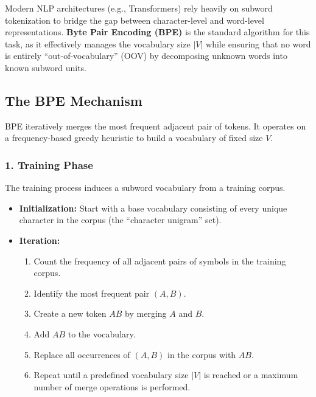 \documentclass[
  italian,
  11pt,
]{article}
\providecommand{\tightlist}{%
  \setlength{\itemsep}{0pt}\setlength{\parskip}{0pt}}
\begin{document}
Modern NLP architectures (e.g., Transformers) rely heavily on subword
tokenization to bridge the gap between character-level and word-level
representations. \textbf{Byte Pair Encoding (BPE)} is the standard
algorithm for this task, as it effectively manages the vocabulary size
\(|V|\) while ensuring that no word is entirely ``out-of-vocabulary''
(OOV) by decomposing unknown words into known subword units.

\subsection{The BPE Mechanism}\label{the-bpe-mechanism}

BPE iteratively merges the most frequent adjacent pair of tokens. It
operates on a frequency-based greedy heuristic to build a vocabulary of
fixed size \(V\).

\subsubsection{1. Training Phase}\label{training-phase}

The training process induces a subword vocabulary from a training
corpus.

\begin{itemize}
\tightlist
\item
  \textbf{Initialization:} Start with a base vocabulary consisting of
  every unique character in the corpus (the ``character unigram'' set).
\item
  \textbf{Iteration:}

  \begin{enumerate}
  \def\labelenumi{\arabic{enumi}.}
  \tightlist
  \item
    Count the frequency of all adjacent pairs of symbols in the training
    corpus.
  \item
    Identify the most frequent pair \((A, B)\).
  \item
    Create a new token \(AB\) by merging \(A\) and \(B\).
  \item
    Add \(AB\) to the vocabulary.
  \item
    Replace all occurrences of \((A, B)\) in the corpus with \(AB\).
  \item
    Repeat until a predefined vocabulary size \(|V|\) is reached or a
    maximum number of merge operations is performed.
  \end{enumerate}
\end{itemize}
\end{document}
